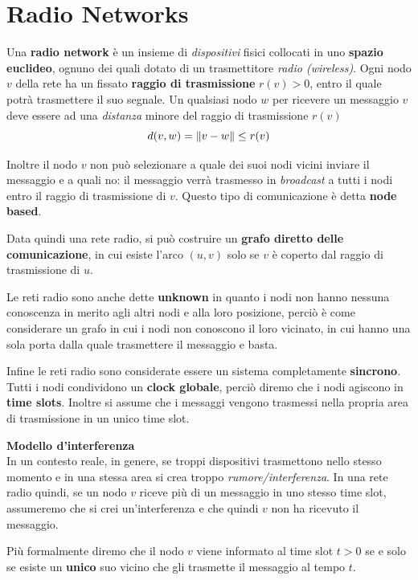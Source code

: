 \chapter{Radio Networks}

Una \textbf{radio network} è un insieme di \textit{dispositivi} fisici collocati in uno \textbf{spazio euclideo}, ognuno dei quali dotato di un trasmettitore \textit{radio (wireless)}. Ogni nodo $v$ della rete ha un fissato \textbf{raggio di trasmissione} $r(v) > 0$, entro il quale potrà trasmettere il suo segnale. Un qualsiasi nodo $w$ per ricevere un messaggio $v$ deve essere ad una \textit{distanza} minore del raggio di trasmissione $r(v)$
\[
    d(v, w) = \norm{v - w} \leq r(v)
\]

Inoltre il nodo $v$ non può selezionare a quale dei suoi nodi vicini inviare il messaggio e a quali no: il messaggio verrà trasmesso in \textit{broadcast} a tutti i nodi entro il raggio di trasmissione di $v$. Questo tipo di comunicazione è detta \textbf{node based}.

Data quindi una rete radio, si può costruire un \textbf{grafo diretto delle comunicazione}, in cui esiste l'arco $(u, v)$ solo se $v$ è coperto dal raggio di trasmissione di $u$.

Le reti radio sono anche dette \textbf{unknown} in quanto i nodi non hanno nessuna conoscenza in merito agli altri nodi e alla loro posizione, perciò è come considerare un grafo in cui i nodi non conoscono il loro vicinato, in cui hanno una sola porta dalla quale trasmettere il messaggio e basta.

Infine le reti radio sono considerate essere un sistema completamente \textbf{sincrono}. Tutti i nodi condividono un \textbf{clock globale}, perciò diremo che i nodi agiscono in \textbf{time slots}. Inoltre si assume che i messaggi vengono trasmessi nella propria area di trasmissione in un unico time slot.

\textbf{Modello d'interferenza} \\
In un contesto reale, in genere, se troppi dispositivi trasmettono nello stesso momento e in una stessa area si crea troppo \textit{rumore/interferenza}. In una rete radio quindi, se un nodo $v$ riceve più di un messaggio in uno stesso time slot, assumeremo che si crei un'interferenza e che quindi $v$ non ha ricevuto il messaggio.

Più formalmente diremo che il nodo $v$ viene informato al time slot $t > 0$ se e solo se esiste un \textbf{unico} suo vicino che gli trasmette il messaggio al tempo $t$.

